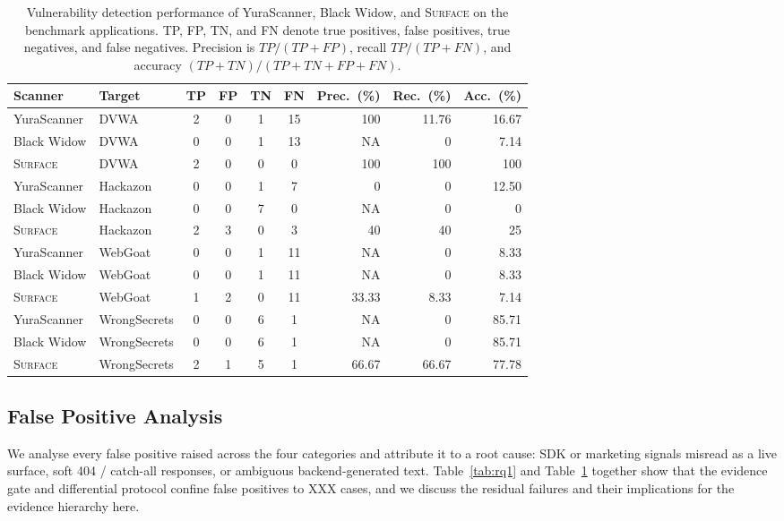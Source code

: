 \begin{table}[t]
\centering
\caption{Vulnerability detection performance of YuraScanner, Black Widow, and
\textsc{Surface} on the benchmark applications. TP, FP, TN, and FN denote true
positives, false positives, true negatives, and false negatives. Precision is
$\mathit{TP}/(\mathit{TP}+\mathit{FP})$, recall $\mathit{TP}/(\mathit{TP}+
\mathit{FN})$, and accuracy $(\mathit{TP}+\mathit{TN})/(\mathit{TP}+
\mathit{TN}+\mathit{FP}+\mathit{FN})$.}
\label{tab:detection}
\small
\begin{tabular}{@{}llccccrrr@{}}
\toprule
\textbf{Scanner} & \textbf{Target} & \textbf{TP} & \textbf{FP} & \textbf{TN} &
\textbf{FN} & \textbf{Prec.\ (\%)} & \textbf{Rec.\ (\%)} & \textbf{Acc.\ (\%)} \\
\midrule
YuraScanner & DVWA & 2 & 0 & 1 & 15 & 100   & 11.76 & 16.67 \\
Black Widow & DVWA & 0 & 0 & 1 & 13 & NA    & 0     & 7.14  \\
\textsc{Surface} & DVWA & 2 & 0 & 0 & 0 & 100 & 100 & 100 \\
\midrule
YuraScanner & Hackazon & 0 & 0 & 1 & 7 & 0   & 0  & 12.50 \\
Black Widow & Hackazon & 0 & 0 & 7 & 0 & NA  & 0  & 0 \\
\textsc{Surface} & Hackazon & 2 & 3 & 0 & 3 & 40 & 40 & 25 \\
\midrule
YuraScanner & WebGoat & 0 & 0 & 1 & 11 & NA   & 0    & 8.33 \\
Black Widow & WebGoat & 0 & 0 & 1 & 11 & NA   & 0    & 8.33 \\
\textsc{Surface} & WebGoat & 1 & 2 & 0 & 11 & 33.33 & 8.33 & 7.14 \\
\midrule
YuraScanner & WrongSecrets & 0 & 0 & 6 & 1 & NA    & 0     & 85.71 \\
Black Widow & WrongSecrets & 0 & 0 & 6 & 1 & NA    & 0     & 85.71 \\
\textsc{Surface} & WrongSecrets & 2 & 1 & 5 & 1 & 66.67 & 66.67 & 77.78 \\
\bottomrule
\end{tabular}
\end{table}

\subsection{False Positive Analysis}
\label{sec:eval:fp}

We analyse every false positive raised across the four categories and attribute
it to a root cause: SDK or marketing signals misread as a live surface, soft
404 / catch-all responses, or ambiguous backend-generated text.
Table~\ref{tab:rq1} and Table~\ref{tab:detection} together show that the
evidence gate and differential protocol confine false positives to
\textsc{XXX} cases, and we discuss the residual failures and their implications
for the evidence hierarchy here.
